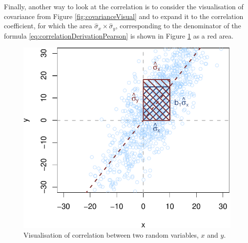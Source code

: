 \documentclass[
]{book}
\theoremstyle{definition}
\theoremstyle{definition}
\theoremstyle{definition}
\theoremstyle{definition}
\theoremstyle{remark}
\begin{document}
Finally, another way to look at the correlation is to consider the visualisation of covariance from Figure \ref{fig:covarianceVisual} and to expand it to the correlation coefficient, for which the area \(\hat{\sigma}_x \times \hat{\sigma}_y\), corresponding to the denominator of the formula \eqref{eq:correlationDerivationPearson} is shown in Figure \ref{fig:correlationVisual2} as a red area.

\begin{figure}
\centering
\includegraphics{Svetunkov---Statistics-for-Business-Analytics_files/figure-latex/correlationVisual2-1.pdf}
\caption{\label{fig:correlationVisual2}Visualisation of correlation between two random variables, \(x\) and \(y\).}
\end{figure}
\end{document}
